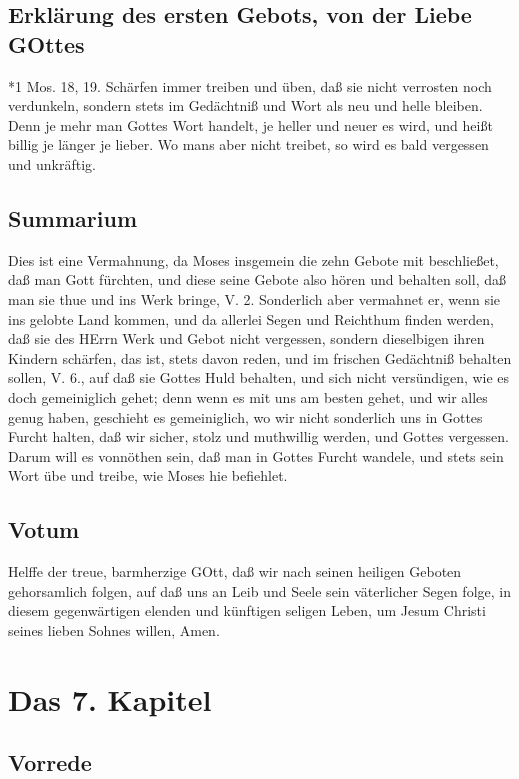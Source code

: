 \section{Erklärung des ersten Gebots, von der Liebe GOttes}

*1 Mos. 18, 19. Schärfen immer treiben und üben, daß sie nicht verrosten noch verdunkeln, sondern stets im Gedächtniß und Wort als neu und helle bleiben. Denn je mehr man Gottes Wort handelt, je heller und neuer es wird, und heißt billig je länger je lieber. Wo mans aber nicht treibet, so wird es bald vergessen und unkräftig.

\section{Summarium}

Dies ist eine Vermahnung, da Moses insgemein die zehn Gebote mit beschließet, daß man Gott fürchten, und diese seine Gebote also hören und behalten soll, daß man sie thue und ins Werk bringe, V. 2. Sonderlich aber vermahnet er, wenn sie ins gelobte Land kommen, und da allerlei Segen und Reichthum finden werden, daß sie des HErrn Werk und Gebot nicht vergessen, sondern dieselbigen ihren Kindern schärfen, das ist, stets davon reden, und im frischen Gedächtniß behalten sollen, V. 6., auf daß sie Gottes Huld behalten, und sich nicht versündigen, wie es doch gemeiniglich gehet; denn wenn es mit uns am besten gehet, und wir alles genug haben, geschieht es gemeiniglich, wo wir nicht sonderlich uns in Gottes Furcht halten, daß wir sicher, stolz und muthwillig werden, und Gottes vergessen. Darum will es vonnöthen sein, daß man in Gottes Furcht wandele, und stets sein Wort übe und treibe, wie Moses hie befiehlet.

\section{Votum}

Helffe der treue, barmherzige GOtt, daß wir nach seinen heiligen Geboten gehorsamlich folgen, auf daß uns an Leib und Seele sein väterlicher Segen folge, in diesem gegenwärtigen elenden und künftigen seligen Leben, um Jesum Christi seines lieben Sohnes willen, Amen.

\chapter{Das 7. Kapitel}

\section{Vorrede}

